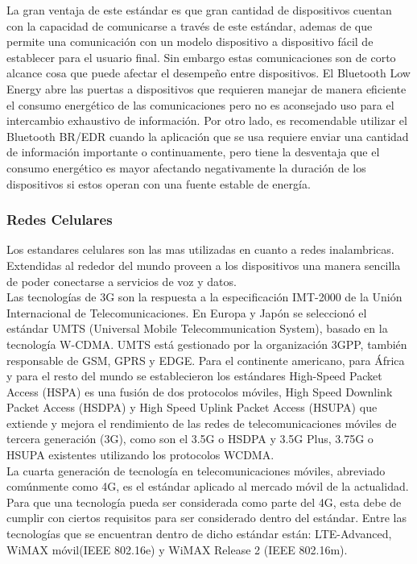 La gran ventaja de este estándar es que gran cantidad de dispositivos cuentan con la capacidad de comunicarse a través de este estándar, ademas de que permite una comunicación con un modelo dispositivo a dispositivo fácil de establecer para el usuario final. Sin embargo estas comunicaciones son de corto alcance cosa que puede afectar el desempeño entre dispositivos. El Bluetooth Low Energy abre las puertas a dispositivos que requieren manejar de manera eficiente el consumo energético de las comunicaciones pero no es aconsejado uso para el intercambio exhaustivo de información. Por otro lado, es recomendable utilizar el Bluetooth BR/EDR cuando la aplicación que se usa requiere enviar una cantidad de información importante o continuamente, pero tiene la desventaja que el consumo energético es mayor afectando negativamente la duración de los dispositivos si estos operan con una fuente estable de energía.

\subsubsection{Redes Celulares}
Los estandares celulares son las mas utilizadas en cuanto a redes inalambricas. Extendidas al rededor del mundo proveen a los dispositivos una manera sencilla de poder conectarse a servicios de voz y datos. \\

Las tecnologías de 3G son la respuesta a la especificación IMT-2000 de la Unión Internacional de Telecomunicaciones\cite{itu2000}. En Europa y Japón se seleccionó el estándar UMTS (Universal Mobile Telecommunication System)\cite{umts}, basado en la tecnología W-CDMA\cite{wcdma}. UMTS está gestionado por la organización 3GPP, también responsable de GSM, GPRS y EDGE. Para el continente americano, para África y para el resto del mundo se establecieron los estándares High-Speed Packet Access (HSPA)\cite{hspa} es una fusión de dos protocolos móviles, High Speed Downlink Packet Access (HSDPA)\cite{hspa} y High Speed Uplink Packet Access (HSUPA)\cite{hspa} que extiende y mejora el rendimiento de las redes de telecomunicaciones móviles de tercera generación (3G), como son el 3.5G o HSDPA y 3.5G Plus, 3.75G o HSUPA existentes utilizando los protocolos WCDMA.\\

La cuarta generación de tecnología en telecomunicaciones móviles, abreviado comúnmente como 4G, es el estándar aplicado al mercado móvil de la actualidad. Para que una tecnología pueda ser considerada como parte del 4G, esta debe de cumplir con ciertos requisitos para ser considerado dentro del estándar. Entre las tecnologías que se encuentran dentro de dicho estándar están: LTE-Advanced\cite{LTE-advanced}, WiMAX móvil(IEEE 802.16e)\cite{ieee80216} y WiMAX Release 2 (IEEE 802.16m).\cite{ieee80216}\\

